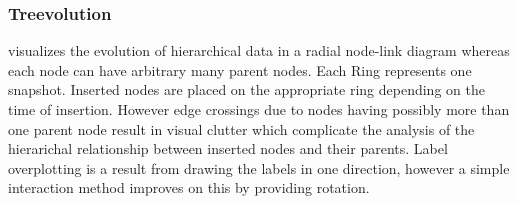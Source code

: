 

\subsubsection{Treevolution\cite{theron2006hierarchical}} visualizes the evolution of hierarchical data in a radial node-link diagram whereas each node can have arbitrary many parent nodes. Each Ring represents one snapshot. Inserted nodes are placed on the appropriate ring depending on the time of insertion. However edge crossings due to nodes having possibly more than one parent node result in visual clutter which complicate the analysis of the hierarichal relationship between inserted nodes and their parents. Label overplotting is a result from drawing the labels in one direction, however a simple interaction method improves on this by providing rotation.


